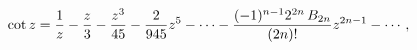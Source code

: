 \[\mathop{\cot\/}\nolimits z=\frac{1}{z}-\frac{z}{3}-\frac{z^{3}}{45}-\frac{2}{9%
45}z^{5}-\cdots-\frac{(-1)^{n-1}2^{2n}\mathop{B_{2n}\/}\nolimits}{(2n)!}z^{2n-%
1}-\cdots,\]